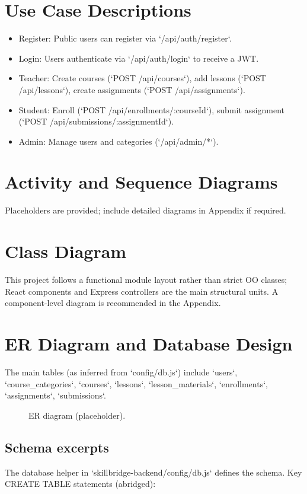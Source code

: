 \documentclass[12pt,a4paper]{report}
\begin{document}
\section{Use Case Descriptions}
\begin{itemize}
  \item Register: Public users can register via `/api/auth/register`.
  \item Login: Users authenticate via `/api/auth/login` to receive a JWT.
  \item Teacher: Create courses (`POST /api/courses`), add lessons (`POST /api/lessons`), create assignments (`POST /api/assignments`).
  \item Student: Enroll (`POST /api/enrollments/:courseId`), submit assignment (`POST /api/submissions/:assignmentId`).
  \item Admin: Manage users and categories (`/api/admin/*`).
\end{itemize}

\section{Activity and Sequence Diagrams}
Placeholders are provided; include detailed diagrams in Appendix if required.

\section{Class Diagram}
This project follows a functional module layout rather than strict OO classes; React components and Express controllers are the main structural units. A component-level diagram is recommended in the Appendix.

\section{ER Diagram and Database Design}
The main tables (as inferred from `config/db.js`) include `users`, `course_categories`, `courses`, `lessons`, `lesson_materials`, `enrollments`, `assignments`, `submissions`.

\begin{figure}[H]
  \centering
  \caption{ER diagram (placeholder).}
  \label{fig:er}
\end{figure}

\subsection{Schema excerpts}
The database helper in `skillbridge-backend/config/db.js` defines the schema. Key CREATE TABLE statements (abridged):
\end{document}
